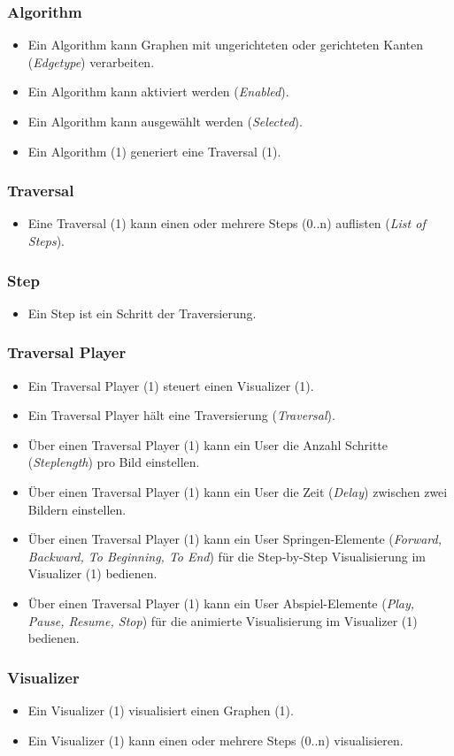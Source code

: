 \subsubsection{Algorithm}
\label{subsubsec:Algorithm}
\begin{itemize}
  \item Ein Algorithm kann Graphen mit ungerichteten oder gerichteten Kanten (\textit{Edgetype}) verarbeiten.
  \item Ein Algorithm kann aktiviert werden (\textit{Enabled}).
  \item Ein Algorithm kann ausgew\"ahlt werden (\textit{Selected}).
  \item Ein Algorithm (1) generiert eine Traversal (1).
\end{itemize}
% 
\subsubsection{Traversal}
\label{subsubsec:Traversal}
\begin{itemize}
  \item Eine Traversal (1) kann einen oder mehrere Steps (0..n) auflisten (\textit{List of Steps}).
\end{itemize}

\subsubsection{Step}
\label{subsubsec:Step}
\begin{itemize}
  \item Ein Step ist ein Schritt der Traversierung.
\end{itemize}

\subsubsection{Traversal Player}
\label{subsubsec:Traversal Player}
\begin{itemize}
  \item Ein Traversal Player (1) steuert einen Visualizer (1).
  \item Ein Traversal Player h\"alt eine Traversierung (\textit{Traversal}).
  \item \"Uber einen Traversal Player (1) kann ein User die Anzahl Schritte (\textit{Steplength}) pro Bild einstellen.
  \item \"Uber einen Traversal Player (1) kann ein User die Zeit (\textit{Delay}) zwischen zwei Bildern einstellen.
  \item \"Uber einen Traversal Player (1) kann ein User Springen-Elemente (\textit{Forward, Backward, To Beginning, To End}) f\"ur die Step-by-Step Visualisierung im Visualizer (1) bedienen.
  \item \"Uber einen Traversal Player (1) kann ein User Abspiel-Elemente (\textit{Play, Pause, Resume, Stop}) f\"ur die animierte Visualisierung im Visualizer (1) bedienen.
\end{itemize}

\subsubsection{Visualizer}
\label{subsubsec:Visualizer}
\begin{itemize}
  \item Ein Visualizer (1) visualisiert einen Graphen (1).
  \item Ein Visualizer (1) kann einen oder mehrere Steps (0..n) visualisieren.
\end{itemize}